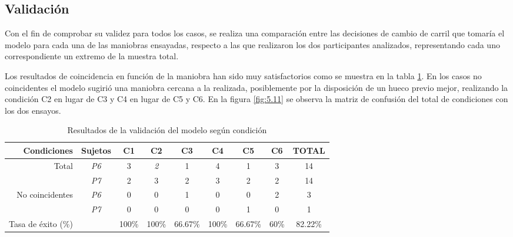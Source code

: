 \subsection{Validación} \label{543}
Con el fin de comprobar su validez para todos los casos, se realiza una comparación entre las decisiones de cambio de carril que tomaría el modelo para cada una de las maniobras ensayadas, respecto a las que realizaron los dos participantes analizados, representando cada uno correspondiente un extremo de la muestra total.

Los resultados de coincidencia en función de la maniobra han sido muy satisfactorios como se muestra en la tabla \ref{tab:5.10}. En los casos no coincidentes el modelo sugirió una maniobra cercana a la realizada, posiblemente por la disposición de un hueco previo mejor, realizando la condición C2 en lugar de C3 y C4 en lugar de C5 y C6. En la figura \ref{fig:5.11} se observa la matriz de confusión del total de condiciones con los dos ensayos. 

\begin{table}[h]
\centering
\begin{tabular}{@{}rcccccccc@{}}
\textbf{Condiciones}             & \textbf{Sujetos} & \textbf{C1} & \textbf{C2} & \textbf{C3} & \textbf{C4} & \textbf{C5} & \textbf{C6} & \textbf{TOTAL} \\ \midrule
\multirow{2}{*}{Total}           & \textit{P6}      & 3           & \textit{2}  & 1           & 4           & 1           & 3           & 14             \\ \cmidrule(l){2-9} 
                                 & \textit{P7}      & 2           & 3           & 2           & 3           & 2           & 2           & 14             \\ \midrule
\multirow{2}{*}{No coincidentes} & \textit{P6}      & 0           & 0           & 1           & 0           & 0           & 2           & 3              \\ \cmidrule(l){2-9} 
                                 & \textit{P7}      & 0           & 0           & 0           & 0           & 1           & 0           & 1              \\ \midrule
Tasa de éxito (\%)                        &                  & 100\%       & 100\%       & 66.67\%     & 100\%       & 66.67\%     & 60\%        & 82.22\%        \\ \bottomrule
\end{tabular}
\caption{Resultados de la validación del modelo según condición}
\label{tab:5.10}
\end{table}

